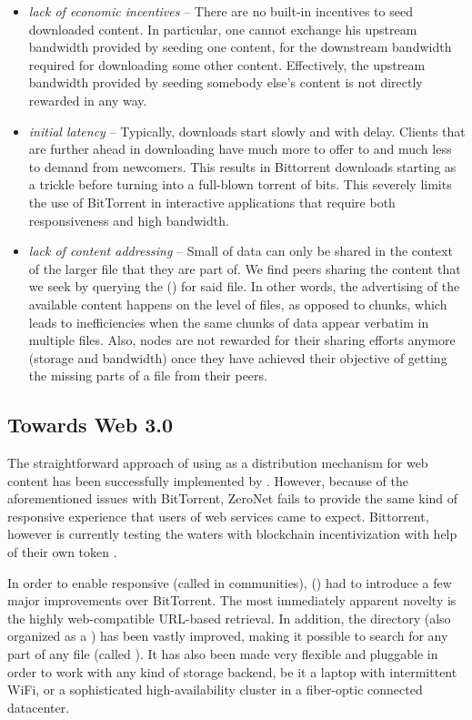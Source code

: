 \begin{itemize}
\item \emph{lack of economic incentives} -- 
There are no built-in incentives to seed downloaded content. In particular, one cannot exchange his upstream bandwidth provided by seeding one content, for the downstream bandwidth required for downloading some other content. Effectively, the upstream bandwidth provided by seeding somebody else's content is not directly rewarded in any way.
\item \emph{initial latency} -- 
 Typically, downloads start slowly and with delay. Clients that are further ahead in downloading have much more to offer to and much less to demand from newcomers. This results in Bittorrent downloads starting as a trickle before turning into a full-blown torrent of bits. This severely limits the use of BitTorrent in interactive applications that require both responsiveness and high bandwidth.
\item \emph{lack of content addressing} -- Small  of data can only be shared in the context of the larger file that they are part of. We find peers sharing the content that we seek by querying the  () for said file. In other words, the advertising of the available content happens on the level of files, as opposed to chunks, which leads to inefficiencies when the same chunks of data appear verbatim in multiple files. Also, nodes are not rewarded for their sharing efforts anymore (storage and bandwidth) once they have achieved their objective of getting the missing parts of a file from their peers.

\end{itemize}

\subsection{Towards Web 3.0}\label{sec:towards-web3}

The straightforward approach of using  as a distribution mechanism for web content has been successfully implemented by  \cite{zeronet}. However, because of the aforementioned issues with BitTorrent, ZeroNet fails to provide the same kind of responsive experience that users of web services came to expect. Bittorrent, however is currently testing the waters with blockchain incentivization with help of their own token \cite{tron}.

In order to enable responsive  (called  in  communities),  () \cite{ipfs2014} had to introduce a few major improvements over BitTorrent. The most immediately apparent novelty is the highly web-compatible URL-based retrieval. In addition, the directory (also organized as a ) has been vastly improved, making it possible to search for any part of any file (called ). It has also been made very flexible and pluggable in order to work with any kind of storage backend, be it a laptop with intermittent WiFi, or a sophisticated high-availability cluster in a fiber-optic connected datacenter.

